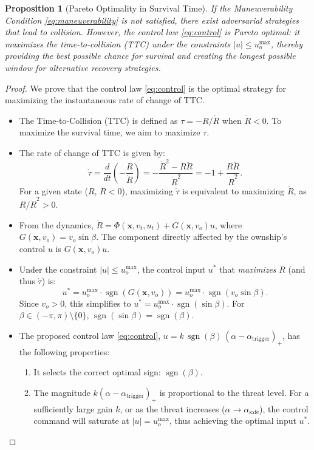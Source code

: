 \documentclass[10pt]{article}
\DeclareMathOperator{\sgn}{sgn}
\theoremstyle{plain}
\newtheorem{proposition}[theorem]{Proposition}
\begin{document}
\begin{proposition}[Pareto Optimality in Survival Time]\label{prop:optimality}
    If the Maneuverability Condition \eqref{eq:maneuverability} is not satisfied, there exist adversarial strategies that lead to collision. However, the control law \eqref{eq:control} is Pareto optimal: it maximizes the time-to-collision (TTC) under the constraints $|u| \leq u_o^{\max}$, thereby providing the best possible chance for survival and creating the longest possible window for alternative recovery strategies.
\end{proposition}

\begin{proof}
    We prove that the control law \eqref{eq:control} is the optimal strategy for maximizing the instantaneous rate of change of TTC.
    \begin{itemize}
        \item The Time-to-Collision (TTC) is defined as $\tau = -R / \dot{R}$ when $\dot{R} < 0$. To maximize the survival time, we aim to maximize $\tau$.
        \item The rate of change of TTC is given by:
        \[
        \dot{\tau} = \frac{d}{dt} \left( -\frac{R}{\dot{R}} \right) = -\frac{\dot{R}^2 - R \ddot{R}}{\dot{R}^2} = -1 + \frac{R \ddot{R}}{\dot{R}^2}.
        \]
        For a given state ($R$, $\dot{R} < 0$), maximizing $\dot{\tau}$ is equivalent to maximizing $\ddot{R}$, as $R / \dot{R}^2 > 0$.
        \item From the dynamics, $\ddot{R} = \Phi(\mathbf{x}, v_t, u_t) + G(\mathbf{x}, v_o) u$, where $G(\mathbf{x}, v_o) = v_o \sin\beta$. The component directly affected by the ownship's control $u$ is $G(\mathbf{x}, v_o) u$.
        \item Under the constraint $|u| \leq u_o^{\max}$, the control input $u^*$ that \textit{maximizes} $\ddot{R}$ (and thus $\dot{\tau}$) is:
        \[
        u^* = u_o^{\max} \cdot \sgn( G(\mathbf{x}, v_o) ) = u_o^{\max} \cdot \sgn( v_o \sin\beta ).
        \]
        Since $v_o > 0$, this simplifies to $u^* = u_o^{\max} \cdot \sgn( \sin\beta )$. For $\beta \in (-\pi, \pi) \setminus \{0\}$, $\sgn(\sin\beta) = \sgn(\beta)$.
        \item The proposed control law \eqref{eq:control}, $u = k \, \sgn(\beta) \, (\alpha - \alpha_{\text{trigger}})_+$, has the following properties:
        \begin{enumerate}
            \item It selects the correct optimal sign: $\sgn(\beta)$.
            \item The magnitude $k (\alpha - \alpha_{\text{trigger}})_+$ is proportional to the threat level. For a sufficiently large gain $k$, or as the threat increases ($\alpha \to \alpha_{\text{safe}}$), the control command will saturate at $|u| = u_o^{\max}$, thus achieving the optimal input $u^*$.

\end{enumerate}
\end{itemize}
\end{proof}
\end{document}
